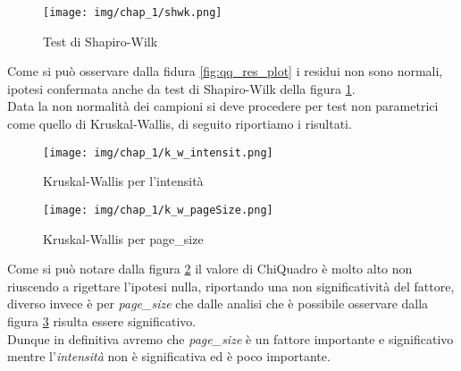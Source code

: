 \begin{figure}[H]
    \centering
    \texttt{[image: img/chap\_1/shwk.png]}
    \caption{Test di Shapiro-Wilk}
    \label{fig:shapWilk}
\end{figure}
\noindent
Come si può osservare dalla fidura \ref{fig:qq_res_plot} i residui non sono normali, ipotesi confermata anche da test di Shapiro-Wilk della figura \ref{fig:shapWilk}.\\
Data la non normalità dei campioni si deve procedere per test non parametrici come quello di Kruskal-Wallis, di seguito riportiamo i risultati.\\
\begin{figure}[H]
    \centering
    \texttt{[image: img/chap\_1/k\_w\_intensit.png]}
    \caption{Kruskal-Wallis per l'intensità}
    \label{fig:k_w_int}
\end{figure}
\begin{figure}[H]
    \centering
    \texttt{[image: img/chap\_1/k\_w\_pageSize.png]}
    \caption{Kruskal-Wallis per page\_size}
    \label{fig:k_w_ps}
\end{figure}
\noindent
Come si può notare dalla figura \ref{fig:k_w_int} il valore di ChiQuadro è molto alto non riuscendo a rigettare l'ipotesi nulla, riportando una non significatività del fattore, diverso invece è per \textit{page\_size} che dalle analisi che è possibile osservare dalla figura \ref{fig:k_w_ps} risulta essere significativo.\\
Dunque in definitiva avremo che \textit{page\_size} è un fattore importante e significativo mentre l'\textit{intensità} non è significativa ed è poco importante.\\ 


  